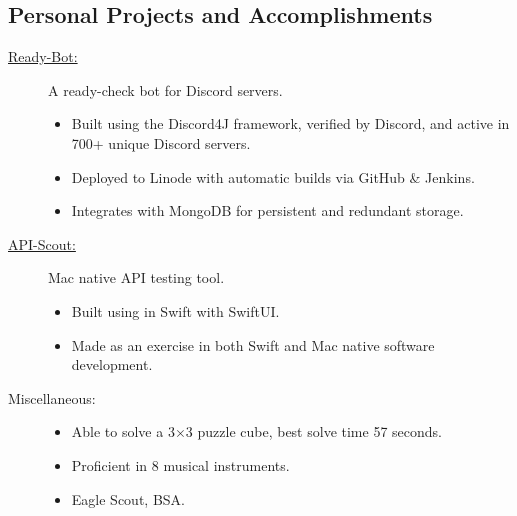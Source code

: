 \documentclass{article}
\def \intraspace {0.1em}
\begin{document}
\subsection*{Personal Projects and Accomplishments}
    \begin{description}
        \item[\href{https://www.github.com/BurnsCommaLucas/ready-botlin}{Ready-Bot:\hspace{0.075in}}] A ready-check bot for Discord servers.
            \begin{itemize}
                \item Built using the Discord4J framework, verified by Discord, and active in 700+ unique Discord servers.
                \item Deployed to Linode with automatic builds via GitHub \& Jenkins.
                \item Integrates with MongoDB for persistent and redundant storage.
            \end{itemize}

            \vspace{\intraspace}

        \item[\href{https://github.com/BurnsCommaLucas/API-Scout}{API-Scout:\hspace{0.075in}}] Mac native API testing tool.
            \begin{itemize}
            	\item Built using in Swift with SwiftUI.
            	\item Made as an exercise in both Swift and Mac native software development.
            \end{itemize}

            \vspace{\intraspace}

        \item[Miscellaneous:] \hfill
            \begin{itemize}
                \item Able to solve a 3$\times$3 puzzle cube, best solve time 57 seconds.
                \item Proficient in 8 musical instruments.
                \item Eagle Scout, BSA.
        \end{itemize}
    \end{description}

\end{document}
